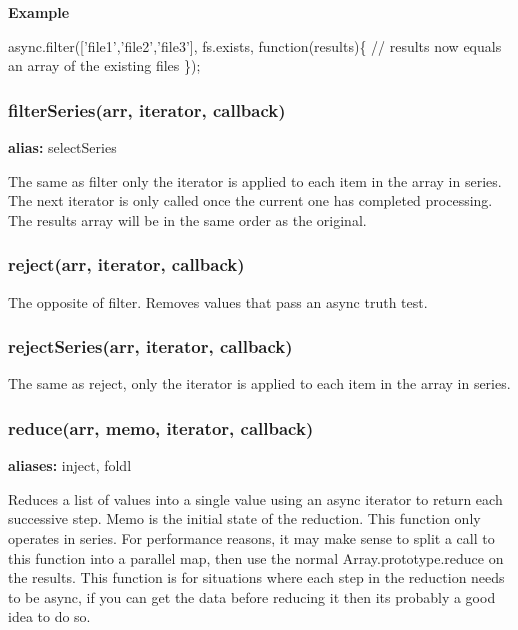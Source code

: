 {\bfseries Example}


\begin{DoxyCode}
async.filter(['file1','file2','file3'], fs.exists, function(results)\{
    // results now equals an array of the existing files
\});
\end{DoxyCode}
 



\label{_filterSeries}%
 \subsubsection*{filter\+Series(arr, iterator, callback)}

{\bfseries alias\+:} select\+Series

The same as filter only the iterator is applied to each item in the array in series. The next iterator is only called once the current one has completed processing. The results array will be in the same order as the original. 



\label{_reject}%
 \subsubsection*{reject(arr, iterator, callback)}

The opposite of filter. Removes values that pass an async truth test. 



\label{_rejectSeries}%
 \subsubsection*{reject\+Series(arr, iterator, callback)}

The same as reject, only the iterator is applied to each item in the array in series.





\label{_reduce}%
 \subsubsection*{reduce(arr, memo, iterator, callback)}

{\bfseries aliases\+:} inject, foldl

Reduces a list of values into a single value using an async iterator to return each successive step. Memo is the initial state of the reduction. This function only operates in series. For performance reasons, it may make sense to split a call to this function into a parallel map, then use the normal Array.\+prototype.\+reduce on the results. This function is for situations where each step in the reduction needs to be async, if you can get the data before reducing it then it\textquotesingle{}s probably a good idea to do so.

